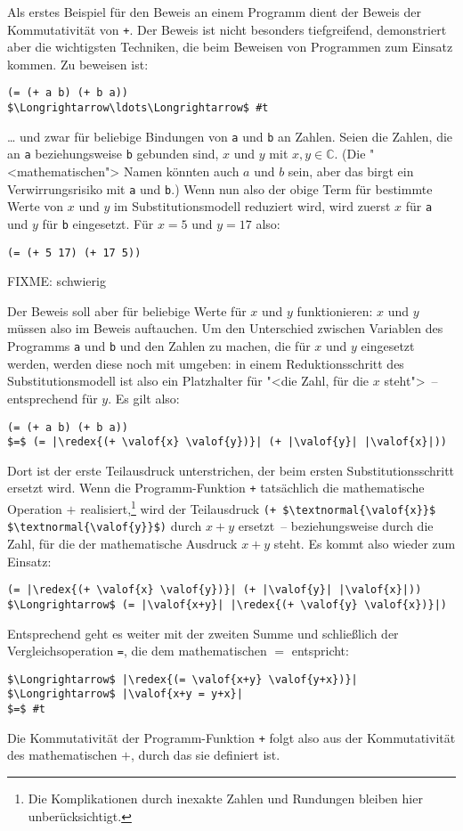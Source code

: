Als erstes Beispiel für den Beweis an einem Programm dient der Beweis
der Kommutativität von \lstinline{+}.  Der Beweis ist nicht besonders
tiefgreifend, demonstriert aber die wichtigsten Techniken, die beim
Beweisen von Programmen zum Einsatz kommen.  Zu beweisen ist:
%
\begin{lstlisting}
(= (+ a b) (+ b a))
$\Longrightarrow\ldots\Longrightarrow$ #t
\end{lstlisting}
%
\ldots{} und zwar für beliebige Bindungen von \lstinline{a} und
\lstinline{b} an Zahlen.  Seien die Zahlen, die an \lstinline{a} beziehungsweise
\lstinline{b} gebunden sind, $x$ und $y$ mit $x,y\in\mathbb{C}$.  (Die
"<mathematischen"> Namen könnten auch $a$ und $b$ sein, aber das birgt
ein Verwirrungsrisiko mit \lstinline{a} und \lstinline{b}.)  Wenn nun also
der obige Term für bestimmte Werte von $x$ und $y$ im
Substitutionsmodell reduziert wird, wird zuerst $x$ für \lstinline{a} und
$y$ für \lstinline{b} eingesetzt.  Für $x=5$ und $y=17$ also:
%
\begin{lstlisting}
(= (+ 5 17) (+ 17 5))
\end{lstlisting}
%
FIXME: \valof{\_} schwierig

Der Beweis soll aber für beliebige Werte für $x$ und $y$
funktionieren: $x$ und $y$ müssen also im Beweis auftauchen.
Um den Unterschied zwischen Variablen des Programms \lstinline{a} und
\lstinline{b} und den Zahlen zu machen, die für $x$ und $y$ eingesetzt
werden, werden diese noch mit \valof{\_} umgeben:  in
einem Reduktionsschritt des Substitutionsmodell ist also ein
Platzhalter für "<die Zahl, für die $x$ steht">~-- entsprechend für $y$.
Es gilt also:

\begin{lstlisting}
(= (+ a b) (+ b a))
$=$ (= |\redex{(+ \valof{x} \valof{y})}| (+ |\valof{y}| |\valof{x}|))
\end{lstlisting}
%
Dort ist der erste Teilausdruck unterstrichen, der beim ersten
Substitutionsschritt ersetzt wird.  Wenn die Programm-Funktion
\lstinline{+} tatsächlich die mathematische Operation $+$
realisiert,\footnote{Die Komplikationen durch inexakte Zahlen und
  Rundungen bleiben hier unberücksichtigt.}
wird der Teilausdruck \lstinline[mathescape]!(+ $\textnormal{\valof{x}}$ $\textnormal{\valof{y}}$)! durch $x+y$
ersetzt~-- beziehungsweise durch die Zahl, für die der mathematische
Ausdruck $x+y$ steht.  Es kommt also wieder \valof{\_} zum Einsatz:
%
\begin{lstlisting}
(= |\redex{(+ \valof{x} \valof{y})}| (+ |\valof{y}| |\valof{x}|))
$\Longrightarrow$ (= |\valof{x+y}| |\redex{(+ \valof{y} \valof{x})}|)
\end{lstlisting}
%
Entsprechend geht es weiter mit der zweiten Summe und schließlich der
Vergleichsoperation \lstinline{=}, die dem mathematischen $=$ entspricht:
%
\begin{lstlisting}
$\Longrightarrow$ |\redex{(= \valof{x+y} \valof{y+x})}|
$\Longrightarrow$ |\valof{x+y = y+x}|
$=$ #t
\end{lstlisting}
%
Die Kommutativität der Programm-Funktion \lstinline{+} folgt also aus der
Kommutativität des mathematischen $+$, durch das sie definiert ist.

